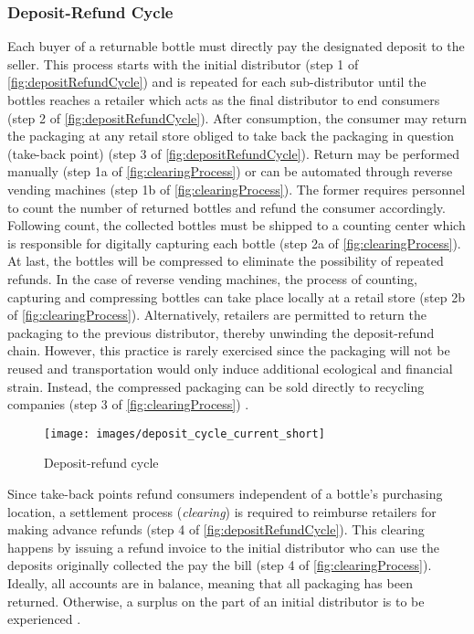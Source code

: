 \subsubsection{Deposit-Refund Cycle}
\label{sec:depositRefundCycle}
Each buyer of a returnable bottle must directly pay the designated deposit to the seller. This process starts with the initial distributor (step 1 of \autoref{fig:depositRefundCycle}) and is repeated for each sub-distributor until the bottles reaches a retailer which acts as the final distributor to end consumers (step 2 of \autoref{fig:depositRefundCycle}). After consumption, the consumer may return the packaging at any retail store obliged to take back the packaging in question (take-back point) (step 3 of \autoref{fig:depositRefundCycle}). Return may be performed manually (step 1a of \autoref{fig:clearingProcess}) or can be automated through reverse vending machines (step 1b of \autoref{fig:clearingProcess}). The former requires personnel to count the number of returned bottles and refund the consumer accordingly. Following count, the collected bottles must be shipped to a counting center which is responsible for digitally capturing each bottle (step 2a of \autoref{fig:clearingProcess}). At last, the bottles will be compressed to eliminate the possibility of repeated refunds. In the case of reverse vending machines, the process of counting, capturing and compressing bottles can take place locally at a retail store (step 2b of \autoref{fig:clearingProcess}). Alternatively, retailers are permitted to return the packaging to the previous distributor, thereby unwinding the deposit-refund chain. However, this practice is rarely exercised since the packaging will not be reused and transportation would only induce additional ecological and financial strain. Instead, the compressed packaging can be sold directly to recycling companies (step 3 of \autoref{fig:clearingProcess}) \cite[p.~16-17]{Hartlep2011Recycling} \cite{reiling}.  

\begin{figure}[hbt]
  \centering
  \texttt{[image: images/deposit\_cycle\_current\_short]}
  \caption{Deposit-refund cycle \cite[p.~14]{Hartlep2011Recycling}}
  \label{fig:depositRefundCycle}
\end{figure}

Since take-back points refund consumers independent of a bottle’s purchasing location, a settlement process (\textit{clearing}) is required to reimburse retailers for making advance refunds (step 4 of \autoref{fig:depositRefundCycle}). This clearing happens by issuing a refund invoice to the initial distributor who can use the deposits originally collected the pay the bill (step 4 of \autoref{fig:clearingProcess}). Ideally, all accounts are in balance, meaning that all packaging has been returned. Otherwise, a surplus on the part of an initial distributor is to be experienced \cite[p.~17]{Hartlep2011Recycling}.

